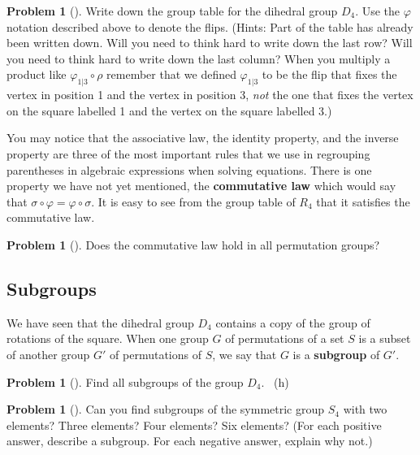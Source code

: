 \documentclass[10pt,]{book}
\newcommand{\terminology}[1]{\textbf{#1}}
\theoremstyle{plain}
\theoremstyle{definition}
\newtheorem{activity}[project]{Problem}
\theoremstyle{definition}
\numberwithin{equation}{chapter}
\begin{document}
\begin{activity}[] \label{dihedral3}
\hypertarget{p-1538}{}%
Write down the group table for the dihedral group \(D_4\). Use the \(\varphi\) notation described above to denote the flips. (Hints: Part of the table has already been written down. Will you need to think hard to write down the last row? Will you need to think hard to write down the last column? When you multiply a product like \(\varphi_{1|3}
\circ \rho\) remember that we defined \(\varphi_{1|3}\) to be the flip that fixes the vertex in position 1 and the vertex in position 3, \emph{not} the one that fixes the vertex on the square labelled 1 and the vertex on the square labelled 3.)%
\end{activity}
\hypertarget{p-1539}{}%
You may notice that the associative law, the identity property, and the inverse property are three of the most important rules that we use in regrouping parentheses in algebraic expressions when solving equations. There is one property we have not yet mentioned, the \terminology{commutative law} which would say that \(\sigma\circ \varphi =
\varphi\circ\sigma\). It is easy to see from the group table of \(R_4\) that it satisfies the commutative law.%
\begin{activity}[]\marginsymbol[-1em]{} \label{activity-269}
\hypertarget{p-1540}{}%
Does the commutative law hold in all permutation groups?%
\end{activity}
\typeout{************************************************}
\typeout{************************************************}
\subsection[{Subgroups}]{Subgroups}\label{subsection-63}
\hypertarget{p-1542}{}%
We have seen that the dihedral group \(D_4\) contains a copy of the group of rotations of the square. When one group \(G\) of permutations of a set \(S\) is a subset of another group \(G'\) of permutations of \(S\), we say that \(G\) is a \terminology{subgroup} of \(G'\). %
\begin{activity}[] \label{S4}
\hypertarget{p-1543}{}%
Find all subgroups of the group \(D_4\).%
~{\tiny (h)}\end{activity}
\begin{activity}[]\marginsymbol[-1em]{} \label{activity-271}
\hypertarget{p-1546}{}%
Can you find subgroups of the symmetric group \(S_4\) with two elements? Three elements? Four elements? Six elements? (For each positive answer, describe a subgroup. For each negative answer, explain why not.)%
\end{activity}
\typeout{************************************************}
\typeout{************************************************}
\end{document}
